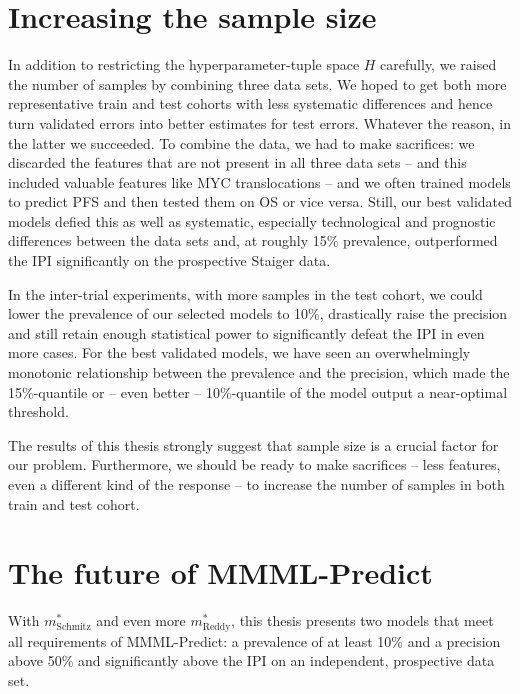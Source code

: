 \section{Increasing the sample size}

In addition to restricting the hyperparameter-tuple space $H$ carefully, we raised the number of 
samples by combining three data sets. We hoped to get both more representative train and test 
cohorts with less systematic differences and hence turn validated errors into better estimates 
for test errors. Whatever the reason, in the latter we succeeded. To combine the data, we had to 
make sacrifices: we discarded the features that are 
not present in all three data sets -- and this included valuable features like MYC translocations -- 
and we often trained models to predict PFS and then tested them on OS or vice versa. Still, our 
best validated models defied this as well as systematic, especially technological and prognostic 
differences between the data sets and, at roughly \num{15}\% prevalence, outperformed the IPI 
significantly on the prospective Staiger data.

In the inter-trial experiments, with more samples in the test cohort, we could lower the prevalence 
of our selected models to \num{10}\%, drastically raise the precision and still retain enough 
statistical power to significantly defeat the IPI in even more cases. For the best validated models, 
we have seen an overwhelmingly monotonic relationship between the prevalence and the precision, 
which made the \num{15}\%-quantile or -- even better -- \num{10}\%-quantile of the model output a 
near-optimal threshold. 

The results of this thesis strongly suggest that sample size is a crucial factor 
for our problem. Furthermore, we should be ready to make sacrifices -- less features, 
even a different kind of the response -- to increase the number of samples in both train and test 
cohort. 

\section{The future of MMML-Predict}\label{subsec:discussion-mmml}

With $m^*_\text{Schmitz}$ and even more $m^*_\text{Reddy}$, this thesis presents two 
models that meet all requirements of MMML-Predict: a prevalence of at least \num{10}\% and a 
precision above \num{50}\% and significantly above the IPI on an independent, prospective data set. 

